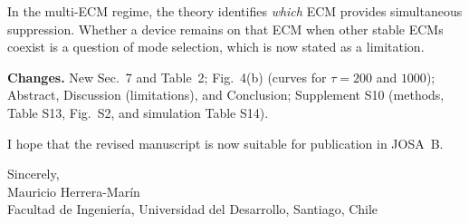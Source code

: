 \documentclass[11pt]{article}
\newcommand{\chg}{\par\noindent\textbf{Changes.} }
\begin{document}
In the multi-ECM regime, the theory identifies \emph{which} ECM provides simultaneous suppression. Whether a device remains on that ECM when other stable ECMs coexist is a question of mode selection, which is now stated as a limitation.
\chg New Sec.~7 and Table~2; Fig.~4(b) (curves for $\tau=200$ and $1000$); Abstract, Discussion (limitations), and Conclusion; Supplement S10 (methods, Table S13, Fig.~S2, and simulation Table S14).

\bigskip
\noindent I hope that the revised manuscript is now suitable for publication in JOSA~B.

\medskip
\noindent Sincerely,\\[2pt]
Mauricio Herrera-Mar\'in\\
Facultad de Ingenier\'ia, Universidad del Desarrollo, Santiago, Chile
\end{document}
